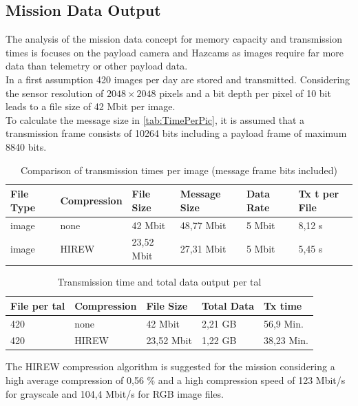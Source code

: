 \subsection{Mission Data Output}
\label{app:MissionDataOutput}

The analysis of the mission data concept for memory capacity and transmission times is focuses on the payload camera and Hazcams as images require far more data than telemetry or other payload data. \\

In a first assumption 420 images per day are stored and transmitted. Considering the sensor resolution of $2048\times2048$ pixels and a bit depth per pixel of 10 bit leads to a file size of 42 Mbit per image.\\
To calculate the message size in \autoref{tab:TimePerPic}, it is assumed that a transmission frame consists of 10264 bits including a payload frame of maximum 8840 bits.   

\begin{table}[h]
\centering
\begin{tabular}{llllll}
File Type & Compression    & File Size  & Message Size & Data Rate & Tx t per File \\ \hline\hline
image     & none           & 42 Mbit    & 48,77 Mbit   & 5 Mbit    & 8,12 s        \\
image     & HIREW          & 23,52 Mbit & 27,31 Mbit   & 5 Mbit    & 5,45 s        \\ \hline
\end{tabular}
\caption{Comparison of transmission times per image (message frame bits included)}
\label{tab:TimePerPic}
\end{table}

\begin{table}[h]
\centering
\begin{tabular}{lllll}
File per tal & Compression & File Size  & Total Data & Tx time    \\ \hline\hline
420          & none        & 42 Mbit    & 2,21 GB    & 56,9 Min.  \\
420          & HIREW       & 23,52 Mbit & 1,22 GB    & 38,23 Min. \\ \hline
\end{tabular}
\caption{Transmission time and total data output per tal}
\label{tab:Tx-tptal}
\end{table}

The HIREW compression algorithm is suggested for the mission considering a high average compression of 0,56 \% and a high compression speed of 123 Mbit/s for grayscale and 104,4 Mbit/s for RGB image files. 
\clearpage



